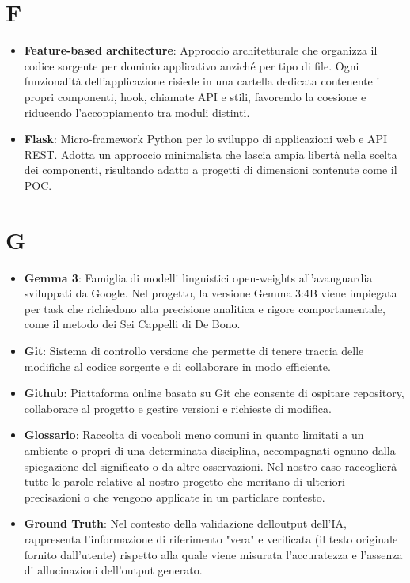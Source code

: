 \documentclass[11pt,a4paper]{article}
\begin{document}
\section*{F}
\begin{itemize}
\item \textbf{Feature-based architecture}: Approccio architetturale che 
organizza il codice sorgente per dominio applicativo anziché per tipo 
di file. Ogni funzionalità dell'applicazione risiede in una cartella 
dedicata contenente i propri componenti, hook, chiamate API e stili, 
favorendo la coesione e riducendo l'accoppiamento tra moduli distinti.

\item \textbf{Flask}: Micro-framework Python per lo sviluppo di 
applicazioni web e API REST. Adotta un approccio minimalista che 
lascia ampia libertà nella scelta dei componenti, risultando 
adatto a progetti di dimensioni contenute come il POC.
\end{itemize}
\newpage

\section*{G}
\begin{itemize}
\item \textbf{Gemma 3}: Famiglia di modelli linguistici open-weights all'avanguardia sviluppati da Google. Nel progetto, la versione Gemma 3:4B viene impiegata per task che richiedono alta precisione analitica e rigore comportamentale, come il metodo dei Sei Cappelli di De Bono.

\item \textbf{Git}: Sistema di controllo versione che permette di tenere traccia delle modifiche al codice sorgente e di collaborare in modo efficiente.

\item \textbf{Github}: Piattaforma online basata su Git che consente di ospitare repository, collaborare al progetto e gestire versioni e richieste di modifica.

\item \textbf{Glossario}: Raccolta di vocaboli meno comuni in quanto limitati a un ambiente o propri di una determinata disciplina, accompagnati ognuno dalla spiegazione del significato o da altre osservazioni. Nel nostro caso raccoglierà tutte le parole relative al nostro progetto che meritano di ulteriori precisazioni o che vengono applicate in un particlare contesto.

\item \textbf{Ground Truth}: Nel contesto della validazione delloutput dell'IA, rappresenta l'informazione di riferimento "vera" e verificata (il testo originale fornito dall'utente) rispetto alla quale viene misurata l'accuratezza e l'assenza di allucinazioni dell'output generato.
\end{itemize}
\newpage
\end{document}
